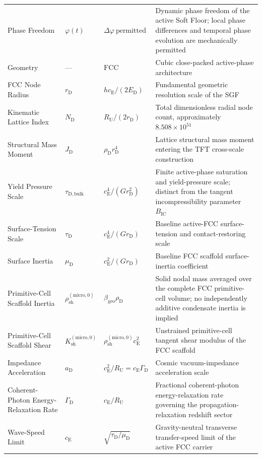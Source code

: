 \begin{longtable}[l]{@{} >{\raggedright\arraybackslash}p{4.2cm} l l >{\raggedright\arraybackslash}p{6.5cm} @{}}
Phase Freedom & $\varphi(t)$ & $\Delta\varphi\ \text{permitted}$ & Dynamic phase freedom of the active Soft Floor; local phase differences and temporal phase evolution are mechanically permitted \\
Geometry & --- & $\mathrm{FCC}$ & Cubic close-packed active-phase architecture \\
FCC Node Radius & $r_{\mathrm{D}}$ & $h c_{\mathrm{E}}/(2E_{\mathrm{D}})$ & Fundamental geometric resolution scale of the SGF \\
Kinematic Lattice Index & $N_{\mathrm{D}}$ & $R_{\mathrm{U}}/(2r_{\mathrm{D}})$ & Total dimensionless radial node count, approximately $8.508\times10^{51}$ \\
Structural Mass Moment & $J_{\mathrm{D}}$ & $\rho_{\mathrm{D}}r_{\mathrm{D}}^{4}$ & Lattice structural mass moment entering the TFT cross-scale construction \\
Yield Pressure Scale & $\tau_{\mathrm{D,bulk}}$ & $c_{\mathrm{E}}^{4}/(G r_{\mathrm{D}}^{2})$ & Finite active-phase saturation and yield-pressure scale; distinct from the tangent incompressibility parameter $B_{\mathrm{IC}}$ \\
Surface-Tension Scale & $\tau_{\mathrm{D}}$ & $c_{\mathrm{E}}^{4}/(G r_{\mathrm{D}})$ & Baseline active-FCC surface-tension and contact-restoring scale \\
Surface Inertia & $\mu_{\mathrm{D}}$ & $c_{\mathrm{E}}^{2}/(G r_{\mathrm{D}})$ & Baseline FCC scaffold surface-inertia coefficient \\
Primitive-Cell Scaffold Inertia & $\rho_{\mathrm{sh}}^{(\mathrm{micro},0)}$ & $\beta_{\mathrm{geo}}\rho_{\mathrm{D}}$ & Solid nodal mass averaged over the complete FCC primitive-cell volume; no independently additive condensate inertia is implied \\
Primitive-Cell Scaffold Shear & $K_{\mathrm{sh}}^{(\mathrm{micro},0)}$ & $\rho_{\mathrm{sh}}^{(\mathrm{micro},0)}c_{\mathrm{E}}^{2}$ & Unstrained primitive-cell tangent shear modulus of the FCC scaffold \\
Impedance Acceleration & $a_{\mathrm{D}}$ & $c_{\mathrm{E}}^{2}/R_{\mathrm{U}}=c_{\mathrm{E}}\Gamma_{\mathrm{D}}$ & Cosmic vacuum-impedance acceleration scale \\
Coherent-Photon Energy-Relaxation Rate & $\Gamma_{\mathrm{D}}$ & $c_{\mathrm{E}}/R_{\mathrm{U}}$ & Fractional coherent-photon energy-relaxation rate governing the propagation-relaxation redshift sector \\
Wave-Speed Limit & $c_{\mathrm{E}}$ & $\sqrt{\tau_{\mathrm{D}}/\mu_{\mathrm{D}}}$ & Gravity-neutral transverse transfer-speed limit of the active FCC carrier \\

\end{longtable}
